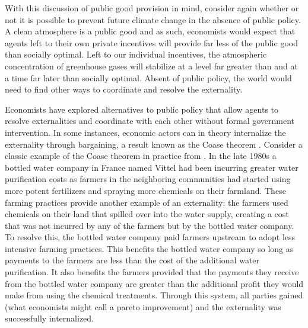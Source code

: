 With this discussion of public good provision in mind, consider again whether or not it is possible to prevent future climate change in the absence of public policy. A clean atmosphere is a public good and as such, economists would expect that agents left to their own private incentives will provide far less of the public good than socially optimal. Left to our individual incentives, the atmospheric concentration of greenhouse gases will stabilize at a level far greater than and at a time far later than socially optimal. Absent of public policy, the world would need to find other ways to coordinate and resolve the externality.

Economists have explored alternatives to public policy that allow agents to resolve externalities and coordinate with each other without formal government intervention. In some instances, economic actors can in theory internalize the externality through bargaining, a result known as the Coase theorem \citep{coase1960problem}. Consider a classic example of the Coase theorem in practice from \cite{keohane2016markets}. In the late 1980s a bottled water company in France named Vittel had been incurring greater water purification costs as farmers in the neighboring communities had started using more potent fertilizers and spraying more chemicals on their farmland. These farming practices provide another example of an externality: the farmers used chemicals on their land that spilled over into the water supply, creating a cost that was not incurred by any of the farmers but by the bottled water company. To resolve this, the bottled water company paid farmers upstream to adopt less intensive farming practices. This benefits the bottled water company so long as payments to the farmers are less than the cost of the additional water purification. It also benefits the farmers provided that the payments they receive from the bottled water company are greater than the additional profit they would make from using the chemical treatments. Through this system, all parties gained (what economists might call a pareto improvement) and the externality was successfully internalized. 

